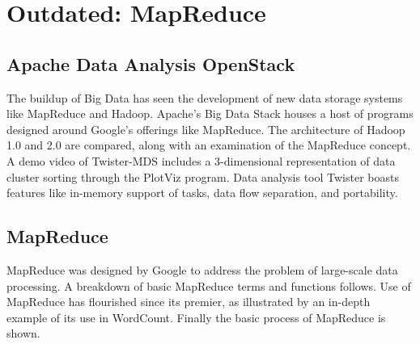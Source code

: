 \chapter{Outdated: MapReduce}
\label{sec:icloud-mapreduce}

\FILENAME


\section{Apache Data Analysis OpenStack}

The buildup of Big Data has seen the development of new data storage
systems like MapReduce and Hadoop. Apache's Big Data Stack houses a host
of programs designed around Google's offerings like MapReduce. The
architecture of Hadoop 1.0 and 2.0 are compared, along with an
examination of the MapReduce concept. A demo video of Twister-MDS
includes a 3-dimensional representation of data cluster sorting through
the PlotViz program. Data analysis tool Twister boasts features like
in-memory support of tasks, data flow separation, and portability.




\section{MapReduce}

MapReduce was designed by Google to address the problem of large-scale
data processing. A breakdown of basic MapReduce terms and functions
follows. Use of MapReduce has flourished since its premier, as
illustrated by an in-depth example of its use in WordCount. Finally the
basic process of MapReduce is shown.




